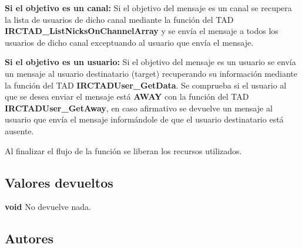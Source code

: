 \begin{DoxyItemize}
\item {\bfseries Si el objetivo es un canal\+:} Si el objetivo del mensaje es un canal se recupera la lista de usuarios de dicho canal mediante la función del T\+AD {\bfseries I\+R\+C\+T\+A\+D\+\_\+\+List\+Nicks\+On\+Channel\+Array} y se envía el mensaje a todos los usuarios de dicho canal exceptuando al usuario que envía el mensaje.  
\item {\bfseries Si el objetivo es un usuario\+:} Si el objetivo del mensaje es un usuario se envía un mensaje al usuario destinatario (target) recuperando su información mediante la función del T\+AD {\bfseries I\+R\+C\+T\+A\+D\+User\+\_\+\+Get\+Data}. Se comprueba si el usuario al que se desea enviar el mensaje está {\bfseries A\+W\+AY} con la función del T\+AD {\bfseries I\+R\+C\+T\+A\+D\+User\+\_\+\+Get\+Away}, en caso afirmativo se devuelve un mensaje al usuario que envía el mensaje informándole de que el usuario destinatario está ausente.  
\end{DoxyItemize}

Al finalizar el flujo de la función se liberan los recursos utilizados.\hypertarget{server_command_privmsg_return_privmsg}{}\subsection{Valores devueltos}\label{server_command_privmsg_return_privmsg}

\begin{DoxyItemize}
\item {\bfseries void} No devuelve nada. 
\end{DoxyItemize}\hypertarget{server_command_privmsg_authors_privmsg}{}\subsection{Autores}\label{server_command_privmsg_authors_privmsg}

